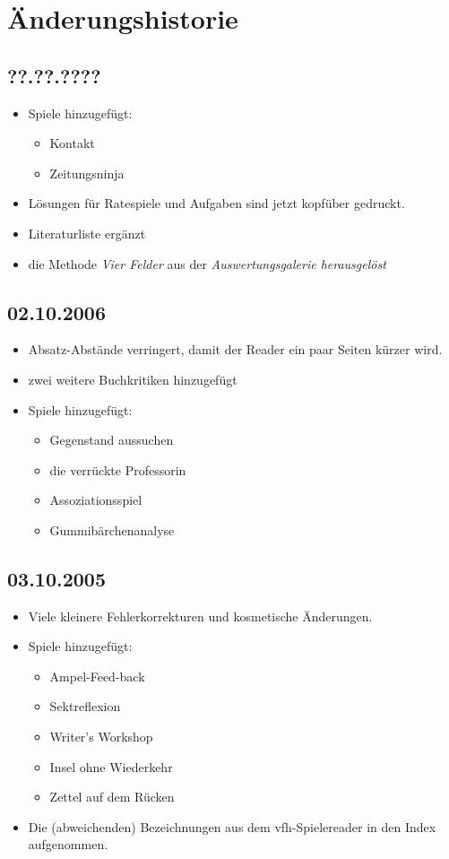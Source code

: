 \chapter{Änderungshistorie}
\section*{??.??.????}
\begin{itemize}
  \item Spiele hinzugefügt:
  \begin{itemize}
    \item Kontakt
    \item Zeitungsninja
  \end{itemize}
  \item Lösungen für Ratespiele und Aufgaben sind jetzt kopfüber gedruckt.
  \item Literaturliste ergänzt
  \item die Methode \emph{Vier Felder} aus der \emph{Auswertungsgalerie herausgelöst}
\end{itemize}


\section*{02.10.2006}
\begin{itemize}
  \item Absatz-Abstände verringert, damit der Reader ein paar Seiten kürzer wird.
  \item zwei weitere Buchkritiken hinzugefügt
  \item Spiele hinzugefügt:
  \begin{itemize}
    \item Gegenstand aussuchen
    \item die verrückte Professorin
    \item Assoziationsspiel
    \item Gummibärchenanalyse
  \end{itemize}
\end{itemize}



\section*{03.10.2005}
\begin{itemize}
  \item Viele kleinere Fehlerkorrekturen und kosmetische Änderungen.
  \item Spiele hinzugefügt:
  \begin{itemize}
    \item Ampel-Feed-back
    \item Sektreflexion
    \item Writer's Workshop
    \item Insel ohne Wiederkehr
    \item Zettel auf dem Rücken
  \end{itemize}
  \item Die (abweichenden) Bezeichnungen aus dem vfh-Spielereader in den Index aufgenommen.
\end{itemize}

